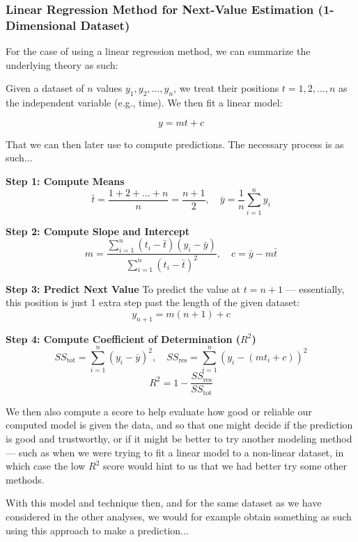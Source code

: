 \documentclass[a4paper, 18pt]{book} %
\begin{document}
\vspace{2em}


\subsubsection{Linear Regression Method for Next-Value Estimation (1-Dimensional Dataset)}

For the case of using a linear regression method, we can summarize the underlying theory as such:

\vspace{2em}

Given a dataset of $n$ values $y_1, y_2, \dots, y_n$, we treat their positions $t = 1, 2, \dots, n$ as the independent variable (e.g., time). We then fit a linear model:

\[
y = mt + c
\]

That we can then later use to compute predictions. The necessary process is as such...

\textbf{Step 1: Compute Means}
\[
\bar{t} = \frac{1 + 2 + \dots + n}{n} = \frac{n+1}{2}, \quad
\bar{y} = \frac{1}{n} \sum_{i=1}^n y_i
\]

\textbf{Step 2: Compute Slope and Intercept}
\[
m = \frac{\sum_{i=1}^n (t_i - \bar{t})(y_i - \bar{y})}{\sum_{i=1}^n (t_i - \bar{t})^2}, \quad
c = \bar{y} - m\bar{t}
\]

\textbf{Step 3: Predict Next Value}
To predict the value at $t = n+1$ --- essentially, this position is just 1 extra step past the length of the given dataset:
\[
y_{n+1} = m(n+1) + c
\]

\textbf{Step 4: Compute Coefficient of Determination ($R^2$)}
\[
SS_{\text{tot}} = \sum_{i=1}^n (y_i - \bar{y})^2, \quad
SS_{\text{res}} = \sum_{i=1}^n (y_i - (mt_i + c))^2
\]
\[
R^2 = 1 - \frac{SS_{\text{res}}}{SS_{\text{tot}}}
\]


We then also compute a score to help evaluate how good or reliable our computed model is given the data, and so that one might decide if the prediction is good and trustworthy, or if it might be better to try another modeling method --- such as when we were trying to fit a linear model to a non-linear dataset, in which case the low $R^2$ score would hint to us that we had better try some other methods.


\vspace{2em}


With this model and technique then, and for the same dataset as we have considered in the other analyses, we would for example obtain something as such using this approach to make a prediction...
\end{document}

